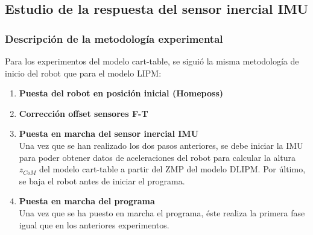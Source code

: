 \subsection{Estudio de la respuesta del sensor inercial IMU}\label{respuestaIMU}

\subsubsection{Descripción de la metodología experimental}

Para los experimentos del modelo cart-table, se siguió la misma metodología de inicio del robot que para el modelo LIPM:

\begin{enumerate}
\item \textbf{Puesta del robot en posición inicial (Homeposs)}\\

\item \textbf{Corrección offset sensores F-T} 

\item \textbf{Puesta en marcha del sensor inercial IMU}\\ Una vez que se han realizado los dos pasos anteriores, se debe iniciar la IMU para poder obtener datos de aceleraciones del robot para calcular la altura $z_{CoM}$ del modelo cart-table a partir del ZMP del modelo DLIPM. Por último, se baja el robot antes de iniciar el programa.

\item \textbf{Puesta en marcha del programa}\\ Una vez que se ha puesto en marcha el programa, éste realiza la primera fase igual que en los anteriores experimentos. 
\end{enumerate}




\afterpage{\null\newpage}
\newpage
